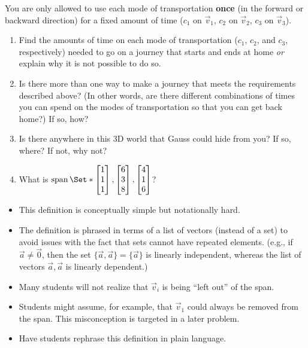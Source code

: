 \begin{iola}
You are only allowed to use each mode of transportation \textbf{once}
(in the forward or backward direction) for a fixed amount of time ($c_1$
on $\vec v_1$, $c_2$ on $\vec v_2$, $c_3$ on $\vec v_3$).

\vspace{5mm}


\begin{enumerate}
	\item  Find the amounts of time on each mode of transportation ($c_1$, $c_2$,
		and $c_3$, respectively) needed to go on a journey that starts and ends
		at home \emph{or} explain why it is not possible to do so.

	\item Is there more than one way to make a journey that meets the
		requirements described above? (In other words, are there different
		combinations of times you can spend on the modes of transportation so
		that you can get back home?) If so, how?

	\item Is there anywhere in this 3D world that Gauss
		could hide from you? If so, where? If not, why not?

	\item What is $\Span\Set*{\mat{1\\1\\1},\mat{6\\3\\8},\mat{4\\1\\6}}$?

\end{enumerate}
\end{iola}


	\begin{annotation}
		\begin{goals}
		\end{goals}

		\begin{notes}
			\begin{itemize}
				\item This definition is conceptually simple but notationally hard.
				\item The definition is phrased in terms of a list of vectors (instead of
					a set) to avoid issues with the fact that sets cannot have repeated elements. (e.g.,
					if $\vec a\neq \vec 0$, then the set $\{\vec a,\vec a\}=\{\vec a\}$ is linearly
					independent, whereas the list of vectors $\vec a,\vec a$ is linearly dependent.)
				\item Many students will not realize that $\vec v_i$ is being ``left out''
					of the span.
				\item Students might assume, for example, that $\vec v_1$ could always be removed
					from the span. This misconception is targeted in a later problem.
				\item Have students rephrase this definition in plain language.
			\end{itemize}
		\end{notes}
	\end{annotation}

